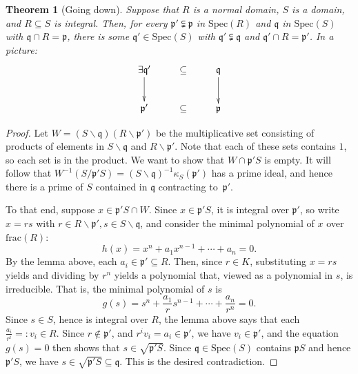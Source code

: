 \documentclass{amsart}[12pt]
\newcommand{\p}{{\mathfrak p}}
\newcommand{\q}{{\mathfrak q}}
\numberwithin{equation}{section}
\theoremstyle{plain} %
\newtheorem{theorem}[equation]{Theorem}
\theoremstyle{definition}
\theoremstyle{remark}
\newcommand{\Spec}{\mathrm{Spec}}
\begin{document}
\begin{theorem}[Going down]
Suppose that $R$ is a normal domain, $S$ is a domain, and $R\subseteq S$ is integral. Then, for every $\p' \subsetneqq \p$ in $\Spec(R)$ and $\q$ in $\Spec(S)$ with $\q \cap R=\p$, there is some $\q'\in \Spec(S)$ with $\q' \subsetneqq \q$ and $\q' \cap R = \p'$. In a picture:
\[ \xymatrix{ \exists \q' \ar[d] &\subseteq& \q \ar[d]\\
\p' & \subseteq & \p  }\]
\end{theorem}
\begin{proof}
 Let $W=(S\smallsetminus \q)(R\smallsetminus\p')$ be the multiplicative set consisting of products of elements in $S\smallsetminus\q$ and $R\smallsetminus \p'$. Note that each of these sets contains $1$, so each set is in the product. We want to show that $W \cap \p'S$ is empty. It will follow that $W^{-1} (S/\p' S)=(S\smallsetminus \q)^{-1} \kappa_S(\p')$ has a prime ideal, and hence there is a prime of $S$ contained in $\q$ contracting to~$\p'$.

To that end, suppose $x\in \p' S \cap W$. Since $x \in\p' S$, it is integral over $\p'$, so write $x=rs$ with $r\in R\smallsetminus \p', s\in S \smallsetminus \q$, and consider the minimal polynomial of $x$ over $\mathrm{frac}(R)$:
\[ h(x) = x^n + a_1 x^{n-1} + \cdots + a_n = 0. \]
By the lemma above, each $a_i\in \p' \subseteq R$. Then, since $r\in K$, substituting $x=rs$ yields and dividing by $r^n$ yields a polynomial that, viewed as a polynomial in $s$, is irreducible. That is, the minimal polynomial of $s$ is 
\[ g(s) = s^n + \frac{a_1}{r} s^{n-1} + \cdots + \frac{a_n}{r^n} = 0.\]
Since $s\in S$, hence is integral over $R$, the lemma above says that each $\frac{a_i}{r^i}=: v_i\in R$. Since $r\notin \p'$, and $r^i v_i =a_i \in\p'$, we have $v_i\in \p'$, and the equation $g(s)=0$ then shows that $s\in \sqrt{\p' S}$. Since $\q \in \Spec(S)$ contains $\p S$ and hence $\p'S$, we have $s\in \sqrt{\p' S}\subseteq \q$. This is the desired contradiction.
\end{proof}
\end{document}

